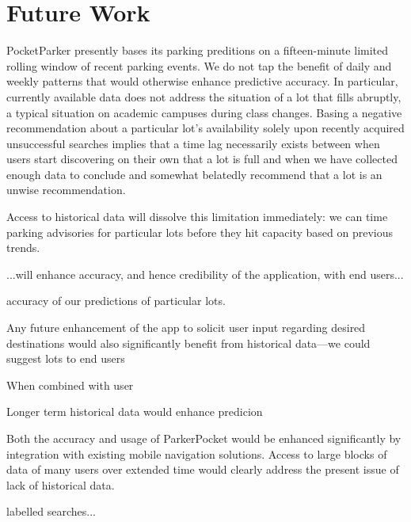 \section{Future Work}
\label{sec-future}



PocketParker presently bases its parking preditions on a fifteen-minute 
limited rolling window of recent parking events. We do not tap the benefit
of daily and weekly patterns that would otherwise enhance predictive accuracy.
In particular, currently available data does not address the situation of a
lot that fills abruptly, a typical situation on academic campuses during
class changes. Basing a negative recommendation about a particular lot's
availability solely upon recently acquired unsuccessful searches implies
that a time lag necessarily exists between when users start discovering on
their own that a lot is full and when we have collected enough data to
conclude and somewhat belatedly recommend that a lot is an unwise
recommendation.

Access to historical data will dissolve this limitation immediately:  we can
time parking advisories for particular lots before they hit capacity based on
previous trends.


...will enhance accuracy, and hence credibility of the application, with end users...

accuracy of our predictions of particular lots.

Any future enhancement of the app to solicit user input regarding desired
destinations would also significantly benefit from historical data---we
could suggest lots to end users 

When combined with user

Longer term historical data
would enhance predicion




Both the accuracy and usage of ParkerPocket would be enhanced significantly
by integration with existing mobile navigation solutions.  Access to large blocks of data of many users over extended time
would clearly address the present issue of lack of historical data.


labelled searches...







